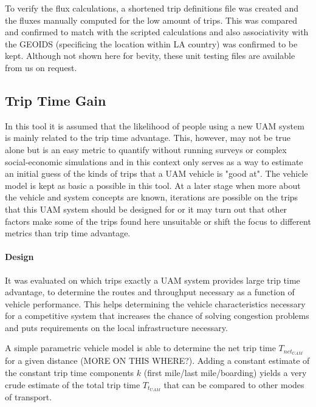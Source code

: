 To verify the flux calculations, a shortened trip definitions file was created and the fluxes manually computed for the low amount of trips. This was compared and confirmed to match with the scripted calculations and also associativity with the GEOIDS (specificing the location within LA country) was confirmed to be kept. Although not shown here for bevity, these unit testing files are available from us on request.










\iffalse
\subsection{Trip Time Gain}

In this tool it is assumed that the likelihood of people using a new UAM system is mainly related to the trip time advantage. This, however, may not be true alone but is an easy metric to quantify without running surveys or complex social-economic simulations and in this context only serves as a way to estimate an initial guess of the kinds of trips that a UAM vehicle is "good at". The vehicle model is kept as basic a possible in this tool. At a later stage when more about the vehicle and system concepts are known, iterations are possible on the trips that this UAM system should be designed for or it may turn out that other factors make some of the trips found here unsuitable or shift the focus to different metrics than trip time advantage.

\paragraph{Design}

It was evaluated on which trips exactly a UAM system provides large trip time advantage, to determine the routes and throughput necessary as a function of vehicle performance. This helps determining the vehicle characteristics necessary for a competitive system that increases the chance of solving congestion problems and puts requirements on the local infrastructure necessary.

A simple parametric vehicle model is able to determine the net trip time $T_{{net}_{UAM}}$ for a given distance (MORE ON THIS WHERE?). Adding a constant estimate of the constant trip time components $k$ (first mile/last mile/boarding) yields a very crude estimate of the total trip time $T_{{t}_{UAM}}$ that can be compared to other modes of transport.

